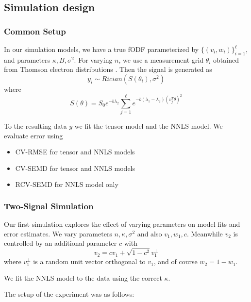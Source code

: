 \documentclass[11pt]{article}
\begin{document}
\subsection{Simulation design}

\subsubsection{Common Setup}

In our simulation models, we have a true fODF parameterized by
$\{(v_i,w_i)\}_{i=1}^\ell$, and parameters $\kappa, B, \sigma^2$.
For varying $n$, we use a measurement grid $\theta_i$ obtained from Thomson electron
distributions \cite{Wales2006}.
Then the signal is generated as
\[
y_i \sim Rician(S(\theta_i), \sigma^2)
\]
where
\[
S(\theta) = S_0 e^{-b\lambda_2}\sum_{j=1}^\ell e^{-b(\lambda_1-\lambda_2)
  (v_j^T \theta)^2}
\]

To the resulting data $y$ we fit the tensor model and the NNLS
model.
We evaluate error using
\begin{itemize}
\item CV-RMSE for tensor and NNLS models
\item CV-SEMD for tensor and NNLS models
\item RCV-SEMD for NNLS model only 
\end{itemize}

\subsubsection{Two-Signal Simulation}\label{sec:twosig}

Our first simulation explores the effect of varying parameters on
model fits and error estimates.
We vary parameters $n,\kappa,\sigma^2$ and also $v_1,w_1,c$.
Meanwhile $v_2$ is controlled by an additional parameter $c$ with 
\[v_2 = c v_1+\sqrt{1-c^2} v_1^\perp\]
where $v_1^\perp$ is a random unit vector orthogonal to $v_1$,
and of course $w_2 = 1-w_1$.

We fit the NNLS model to the data using the correct $\kappa$.

The setup of the experiment was as follows:
\end{document}

